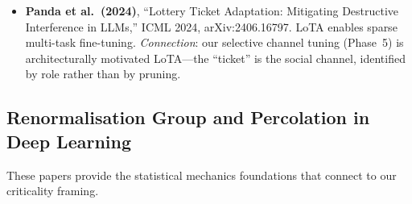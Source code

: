 \documentclass[11pt,a4paper]{article}
\begin{document}
\begin{itemize}
    \item \textbf{Panda et al.\ (2024)}, ``Lottery Ticket Adaptation:
          Mitigating Destructive Interference in LLMs,'' ICML 2024,
          arXiv:2406.16797.  LoTA enables sparse multi-task fine-tuning.
          \emph{Connection}: our selective channel tuning (Phase~5) is
          architecturally motivated LoTA---the ``ticket'' is the social
          channel, identified by role rather than by pruning.
\end{itemize}

\subsection{Renormalisation Group and Percolation in Deep Learning}

These papers provide the statistical mechanics foundations that connect
to our criticality framing.
\end{document}
